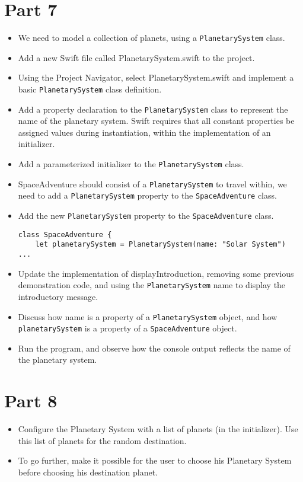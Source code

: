 \documentclass[a4paper,11pt]{scrartcl}
\begin{document}
\section*{Part 7}

\begin{itemize}
\item We need to model a collection of planets, using a \texttt{PlanetarySystem} class.
\item Add a new Swift file called PlanetarySystem.swift to the project.
\item Using the Project Navigator, select PlanetarySystem.swift and implement a basic \texttt{PlanetarySystem} class definition.
\item Add a property declaration to the \texttt{PlanetarySystem} class to represent the name of the planetary system. Swift requires that all constant properties be assigned values during instantiation, within the implementation of an initializer.
\item Add a parameterized initializer to the \texttt{PlanetarySystem} class.
\item SpaceAdventure should consist of a \texttt{PlanetarySystem} to travel within, we need to add a \texttt{PlanetarySystem} property to the \texttt{SpaceAdventure} class.
\item Add the new \texttt{PlanetarySystem} property to the \texttt{SpaceAdventure} class.
\begin{lstlisting}
class SpaceAdventure {
	let planetarySystem = PlanetarySystem(name: "Solar System")
...
\end{lstlisting}
\item Update the implementation of displayIntroduction, removing some previous demonstration code, and using the \texttt{PlanetarySystem} name to display the introductory message.
\item Discuss how name is a property of a \texttt{PlanetarySystem} object, and how \texttt{planetarySystem} is a property of a \texttt{SpaceAdventure} object.
\item Run the program, and observe how the console output reflects the name of the planetary system.
\end{itemize}

\section*{Part 8}

\begin{itemize}
\item Configure the Planetary System with a list of planets (in the initializer). Use this list of planets for the random destination.
\item To go further, make it possible for the user to choose his Planetary System before choosing his destination planet.
\end{itemize}
\end{document}
